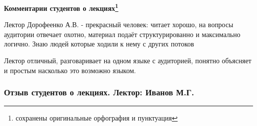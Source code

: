 		\textbf{Комментарии студентов о лекциях\protect\footnote{сохранены оригинальные орфография и пунктуация}}
            \begin{commentbox} 
                Лектор Дорофеенко А.В. - прекрасный человек: читает хорошо, на вопросы аудитории отвечает охотно, материал подаёт структурированно и максимально логично. Знаю людей которые ходили к нему с других потоков 
            \end{commentbox} 
        
            \begin{commentbox} 
                Лектор отличный, разговаривает на одном языке с аудиторией, понятно объясняет и простым насколько это возможно языком. 
            \end{commentbox} 
        
    
    \subsubsection{Отзыв студентов о лекциях. Лектор: Иванов М.Г.}
